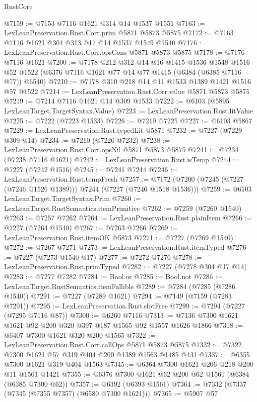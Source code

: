 \begin{lexlean}{RustCore}
\begin{coremodule}
@7159 := @7153 @7116 @1621 @314 @14 @1537 @1551
@7163 := LexLeanPreservation.Rust.Corr.prim @5871 @5873 @5875
@7172 := @7163 @7116 @1621 @304 @313 @17 @14 @1537 @1549 @1540
@7176 := LexLeanPreservation.Rust.Corr.opsCons @5871 @5873 @5875
@7178 := @7176 @7116 @1621
@7200 := @7178
    @212
    @312
    @14
    @16
    @1415
    @1536
    @1548
    @1516
    @52
    @1522
    (@6376 @7116 @1621 @77 @14 @77 @1415 (@6384 (@6385 @7116 @77)) @6540)
@7210 := @7178 @310 @218 @14 @11 @1533 @1389 @1421 @1516 @57 @1522
@7214 := LexLeanPreservation.Rust.Corr.value @5871 @5873 @5875
@7219 := @7214 @7116 @1621 @14 @309 @1533
@7222 := @6103 (@5895 LexLeanTarget.TargetSyntax.Value)
@7223 := LexLeanPreservation.Rust.litValue
@7225 := @7222 (@7223 @1533)
@7226 := @7219 @7225
@7227 := @6103 @5867
@7229 := LexLeanPreservation.Rust.typedLit @5871
@7232 := @7227 (@7229 @309 @14)
@7234 := @7210 (@7226 @7232)
@7238 := LexLeanPreservation.Rust.Corr.opsNil @5871 @5873 @5875
@7241 := @7234 (@7238 @7116 @1621)
@7242 := LexLeanPreservation.Rust.isTemp
@7244 := @7227 (@7242 @1516)
@7245 := @7241 @7244
@7246 := LexLeanPreservation.Rust.tempFresh
@7257 := @7172 (@7200 (@7245 (@7227 (@7246 @1526 @1389))) @7244 (@7227 (@7246 @1518 @1536)))
@7259 := @6103 LexLeanTarget.TargetSyntax.Prim
@7260 := LexLeanTarget.RustSemantics.itemPrimitive
@7262 := @7259 (@7260 @1540)
@7263 := @7257 @7262
@7264 := LexLeanPreservation.Rust.plainItem
@7266 := @7227 (@7264 @1540)
@7267 := @7263 @7266
@7269 := LexLeanPreservation.Rust.itemOK @5873
@7271 := @7227 (@7269 @1540)
@7272 := @7267 @7271
@7273 := LexLeanPreservation.Rust.itemTyped
@7276 := @7227 (@7273 @1540 @17)
@7277 := @7272 @7276
@7278 := LexLeanPreservation.Rust.primTyped
@7282 := @7227 (@7278 @304 @17 @14)
@7283 := @7277 @7282
@7284 := Bool.or
@7285 := Bool.not
@7286 := LexLeanTarget.RustSemantics.itemFallible
@7289 := @7284 (@7285 (@7286 @1540))
@7291 := @7227 (@7289 @1621)
@7294 := @7149 (@7159 (@7283 @7291))
@7295 := LexLeanPreservation.Rust.slotFree
@7299 := @7294 (@7227 (@7295 @7116 @87))
@7300 := @6260 @7116
@7313 := @7136 @7300 @1621 @1621 @92 @200 @320 @397 @187 @1565 @92 @1557 @1626 @1866
@7318 := @6407 @7300 @1621 @320 @200 @1565
@7322 := LexLeanPreservation.Rust.Corr.callOps @5871 @5873 @5875
@7332 := @7322 @7300 @1621 @57 @319 @404 @200 @1389 @1563 @1485 @431
@7337 := @6355 @7300 @1621 @319 @404 @1563
@7345 := @6364 @7300 @1621 @206 @218 @200 @11 @1561 @1421
@7355 := @6376 @7300 @1621 @62 @200 @62 @1561 (@6384 (@6385 @7300 @62))
@7357 := @6392 (@6393 @1561)
@7364 := @7332 (@7337 (@7345 (@7355 @7357) (@6580 @7300 @1621)))
@7365 := @5907 @57

\end{coremodule}
\end{lexlean}
